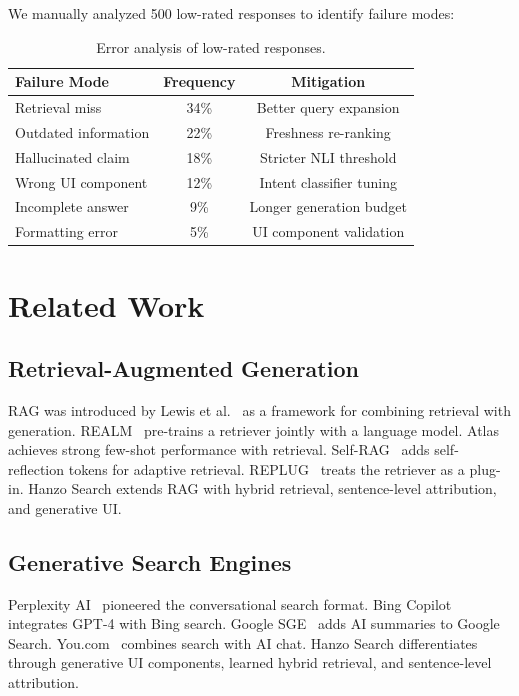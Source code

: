 \documentclass[11pt,twocolumn]{article}
\begin{document}
We manually analyzed 500 low-rated responses to identify failure modes:

\begin{table}[H]
\centering
\small
\begin{tabular}{lcc}
\toprule
\textbf{Failure Mode} & \textbf{Frequency} & \textbf{Mitigation} \\
\midrule
Retrieval miss & 34\% & Better query expansion \\
Outdated information & 22\% & Freshness re-ranking \\
Hallucinated claim & 18\% & Stricter NLI threshold \\
Wrong UI component & 12\% & Intent classifier tuning \\
Incomplete answer & 9\% & Longer generation budget \\
Formatting error & 5\% & UI component validation \\
\bottomrule
\end{tabular}
\caption{Error analysis of low-rated responses.}
\label{tab:errors}
\end{table}

\section{Related Work}
\label{sec:related}

\subsection{Retrieval-Augmented Generation}

RAG was introduced by Lewis et al.~\cite{lewis2020retrieval} as a framework for combining retrieval with generation. REALM~\cite{guu2020realm} pre-trains a retriever jointly with a language model. Atlas~\cite{izacard2023atlas} achieves strong few-shot performance with retrieval. Self-RAG~\cite{asai2023self} adds self-reflection tokens for adaptive retrieval. REPLUG~\cite{shi2023replug} treats the retriever as a plug-in. Hanzo Search extends RAG with hybrid retrieval, sentence-level attribution, and generative UI.

\subsection{Generative Search Engines}

Perplexity AI~\cite{perplexity2023} pioneered the conversational search format. Bing Copilot~\cite{nair2023bing} integrates GPT-4 with Bing search. Google SGE~\cite{google2023sge} adds AI summaries to Google Search. You.com~\cite{you2023} combines search with AI chat. Hanzo Search differentiates through generative UI components, learned hybrid retrieval, and sentence-level attribution.
\end{document}
